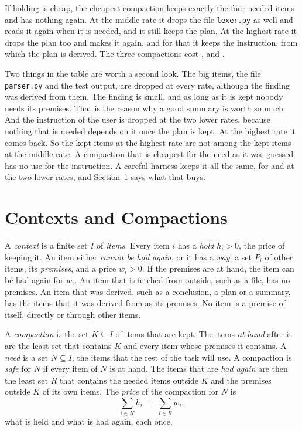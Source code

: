 \documentclass[acmsmall,nonacm,screen]{acmart}
\newcommand{\str}[1]{\texttt{#1}}
\newcommand{\claim}[2]{#2}
\begin{document}
\claim{example}{If holding is cheap, the cheapest compaction keeps exactly the four needed
items and has nothing again. At the middle rate it drops the file \str{lexer.py} as well and
reads it again when it is needed, and it still keeps the plan. At the highest rate it drops
the plan too and makes it again, and for that it keeps the instruction, from which the plan
is derived.} The three compactions cost \exExampleCheap{}, \exExampleDear{} and
\exExampleDearest{}.

Two things in the table are worth a second look. The big items, the file \str{parser.py}
and the test output, are dropped at every rate, although the finding was derived from them.
The finding is small, and as long as it is kept nobody needs its premises. That is the
reason why a good summary is worth so much. \claim{example-instruction}{And the instruction
of the user is dropped at the two lower rates, because nothing that is needed depends on it
once the plan is kept. At the highest rate it comes back. So the kept items at the highest
rate are not among the kept items at the middle rate.} A compaction that is cheapest for the
need as it was guessed has no use for the instruction. A careful harness keeps it all the
same, for \exExamplePinCheap{} and \exExamplePinDear{} at the two lower rates, and
Section~\ref{sec:model} says what that buys.

\section{Contexts and Compactions}\label{sec:model}

A \emph{context} is a finite set $I$ of \emph{items}. Every item $i$ has a \emph{hold}
$h_i > 0$, the price of keeping it. An item either \emph{cannot be had again}, or it has a
\emph{way}: a set $P_i$ of other items, its \emph{premises}, and a price $w_i > 0$. If the
premises are at hand, the item can be had again for $w_i$. An item that is fetched from
outside, such as a file, has no premises. An item that was derived, such as a conclusion, a
plan or a summary, has the items that it was derived from as its premises. No item is a
premise of itself, directly or through other items.

A \emph{compaction} is the set $K \subseteq I$ of items that are kept. The items \emph{at
hand} after it are the least set that contains $K$ and every item whose premises it
contains. A \emph{need} is a set $N \subseteq I$, the items that the rest of the task will
use. A compaction is \emph{safe} for $N$ if every item of $N$ is at hand. The items that are
\emph{had again} are then the least set $R$ that contains the needed items outside $K$ and
the premises outside $K$ of its own items. The \emph{price} of the compaction for $N$ is
\[
  \sum_{i \in K} h_i \;+\; \sum_{i \in R} w_i ,
\]
what is held and what is had again, each once.
\end{document}
